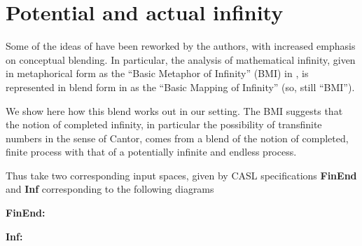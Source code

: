 \section{Potential and actual infinity}


Some of the ideas of \textcite{Lak00} have been reworked by the
authors, with increased emphasis on conceptual blending.
In particular, the analysis of mathematical infinity, given in
metaphorical form as the ``Basic Metaphor of Infinity'' (BMI) in
\textcite{Lak00}, is represented in blend form in \textcite{nunez05}
as the ``Basic Mapping of Infinity'' (so, still ``BMI'').

We show here how this blend works out in our setting.
The BMI suggests that the notion of completed infinity,
in particular the possibility of transfinite numbers in the sense
of Cantor, comes from a blend of the notion of completed,
finite process with that of a potentially infinite and endless
process.

Thus take two corresponding input spaces, given by CASL specifications
\textbf{FinEnd} and \textbf{Inf} corresponding to the following diagrams


  \noindent
  \textbf{FinEnd:}
\begin{center}
\end{center}
\noindent\textbf{Inf:} 
\begin{center}
\end{center}

